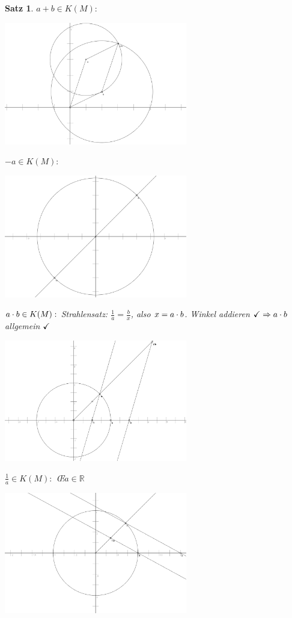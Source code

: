 \documentclass[a4paper,10pt,german]{scrbook}
\theoremstyle{saetze}
\newtheorem{Satz}{Satz}
\theoremstyle{definitionen}
\begin{document}
\begin{Satz}
{$a+b \in K(M):$
\begin{center}
\includegraphics[width=0.6\textwidth]{alg16a1.png}
\end{center}
$-a \in K(M):$
\begin{center}
\includegraphics[width=0.6\textwidth]{alg16a2.png}
\end{center}
$a \cdot b \in K(M):$\newline
Strahlensatz: $\frac{1}{a} = \frac{b}{x}$, also $x = a \cdot b$. Winkel addieren
$\checkmark \Rightarrow a \cdot b$ allgemein $\checkmark$
\begin{center}
\includegraphics[width=0.6\textwidth]{alg16a3.png}
\end{center}

$\frac{1}{a} \in K(M):$ \OE $a \in \mathbb{R}$
\begin{center}
\includegraphics[width=0.6\textwidth]{alg16a4.png}
\end{center}

}
\end{Satz}
\end{document}
